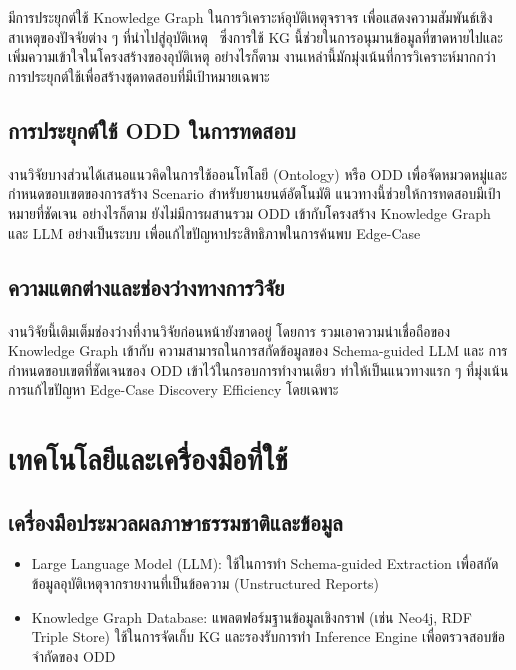 มีการประยุกต์ใช้ Knowledge Graph ในการวิเคราะห์อุบัติเหตุจราจร เพื่อแสดงความสัมพันธ์เชิงสาเหตุของปัจจัยต่าง ๆ ที่นำไปสู่อุบัติเหตุ~\cite{liyan2022analysis} ซึ่งการใช้ KG นี้ช่วยในการอนุมานข้อมูลที่ขาดหายไปและเพิ่มความเข้าใจในโครงสร้างของอุบัติเหตุ อย่างไรก็ตาม งานเหล่านี้มักมุ่งเน้นที่การวิเคราะห์มากกว่าการประยุกต์ใช้เพื่อสร้างชุดทดสอบที่มีเป้าหมายเฉพาะ

\subsection{การประยุกต์ใช้ ODD ในการทดสอบ}\paragraph{}

งานวิจัยบางส่วนได้เสนอแนวคิดในการใช้ออนโทโลยี (Ontology) หรือ ODD เพื่อจัดหมวดหมู่และกำหนดขอบเขตของการสร้าง Scenario สำหรับยานยนต์อัตโนมัติ \cite{bagschik2018ontology} แนวทางนี้ช่วยให้การทดสอบมีเป้าหมายที่ชัดเจน อย่างไรก็ตาม ยังไม่มีการผสานรวม ODD เข้ากับโครงสร้าง Knowledge Graph และ LLM อย่างเป็นระบบ เพื่อแก้ไขปัญหาประสิทธิภาพในการค้นพบ Edge-Case

\subsection{ความแตกต่างและช่องว่างทางการวิจัย}\paragraph{}

งานวิจัยนี้เติมเต็มช่องว่างที่งานวิจัยก่อนหน้ายังขาดอยู่ โดยการ รวมเอาความน่าเชื่อถือของ Knowledge Graph เข้ากับ ความสามารถในการสกัดข้อมูลของ Schema-guided LLM และ การกำหนดขอบเขตที่ชัดเจนของ ODD เข้าไว้ในกรอบการทำงานเดียว ทำให้เป็นแนวทางแรก ๆ ที่มุ่งเน้นการแก้ไขปัญหา Edge-Case Discovery Efficiency โดยเฉพาะ

\section{เทคโนโลยีและเครื่องมือที่ใช้}

\subsection{เครื่องมือประมวลผลภาษาธรรมชาติและข้อมูล}
\begin{itemize}
 \item Large Language Model (LLM): ใช้ในการทำ Schema-guided Extraction เพื่อสกัดข้อมูลอุบัติเหตุจากรายงานที่เป็นข้อความ (Unstructured Reports)
 \item Knowledge Graph Database: แพลตฟอร์มฐานข้อมูลเชิงกราฟ (เช่น Neo4j, RDF Triple Store) ใช้ในการจัดเก็บ KG และรองรับการทำ Inference Engine เพื่อตรวจสอบข้อจำกัดของ ODD
\end{itemize}

